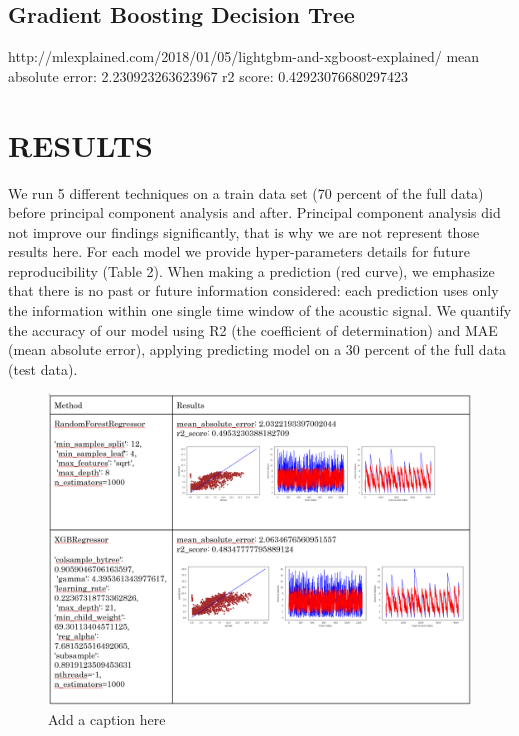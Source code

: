 \documentclass[]{llncs}
\begin{document}
\subsection{Gradient Boosting Decision Tree}
http://mlexplained.com/2018/01/05/lightgbm-and-xgboost-explained/
mean absolute error: 2.230923263623967
r2 score: 0.42923076680297423


\section{RESULTS}
We run 5 different techniques on a train data set (70 percent of the full data) before principal component analysis and after. Principal component analysis did not improve our findings significantly, that is why we are not represent those results here. For each model we provide hyper-parameters details for future reproducibility (Table 2).
When making a prediction (red curve), we emphasize that there is no past or future information considered: each prediction uses only the information within one single time window of the acoustic signal. We quantify the accuracy of our model using R2 (the coefficient of determination) and MAE (mean absolute error), applying predicting model on a 30 percent of the full data (test data).



\begin{figure}
	\centering
	\includegraphics[width=1\linewidth]{../GPUProject/Results1.PNG}
	\caption{Add a caption here}
	\label{fig:morethan90percent}
\end{figure}
\end{document}
